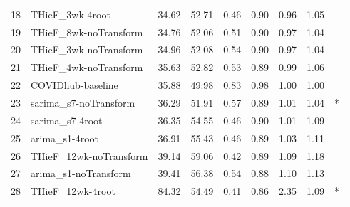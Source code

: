 \documentclass[12pt]{article}
\begin{document}
\begin{table}
\begin{center}
\begin{tabular}{rlrrrrrrl}
  18 & THieF\_3wk-4root & 34.62 & 52.71 & 0.46 & 0.90 & 0.96 & 1.05 &  \\ 
  19 & THieF\_8wk-noTransform & 34.76 & 52.06 & 0.51 & 0.90 & 0.97 & 1.04 &  \\ 
  20 & THieF\_3wk-noTransform & 34.96 & 52.08 & 0.54 & 0.90 & 0.97 & 1.04 &  \\ 
  21 & THieF\_4wk-noTransform & 35.63 & 52.82 & 0.53 & 0.89 & 0.99 & 1.06 &  \\ 
  22 & COVIDhub-baseline & 35.88 & 49.98 & 0.83 & 0.98 & 1.00 & 1.00 &  \\ 
  23 & sarima\_s7-noTransform & 36.29 & 51.91 & 0.57 & 0.89 & 1.01 & 1.04 & * \\ 
  24 & sarima\_s7-4root & 36.35 & 54.55 & 0.46 & 0.90 & 1.01 & 1.09 &  \\ 
  25 & arima\_s1-4root & 36.91 & 55.43 & 0.46 & 0.89 & 1.03 & 1.11 &  \\ 
  26 & THieF\_12wk-noTransform & 39.14 & 59.06 & 0.42 & 0.89 & 1.09 & 1.18 &  \\ 
  27 & arima\_s1-noTransform & 39.41 & 56.38 & 0.54 & 0.88 & 1.10 & 1.13 &  \\ 
  28 & THieF\_12wk-4root & 84.32 & 54.49 & 0.41 & 0.86 & 2.35 & 1.09 & * \\ 
   \hline
\end{tabular}\end{center}
\end{table}
\end{document}
